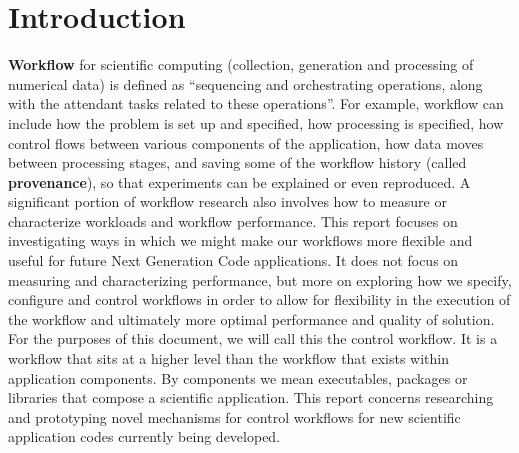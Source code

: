 % 
\section{Introduction}
\label{sec:introduction}

\textbf{Workflow} for scientific computing (collection, generation and processing of numerical data) is 
defined as “sequencing and orchestrating operations, along with the attendant tasks related 
to these operations”\cite{ascr:FutSciWork:2015}.  For example, workflow can include how the problem is
set up and specified, how processing is specified, how control flows between various components
of the application, how data moves between processing stages, and saving some of the workflow
history (called \textbf{provenance}), so that experiments can be explained or even reproduced.  
A significant portion of workflow research also involves how to measure or characterize workloads and
workflow performance.  
This report focuses on investigating ways in which we might make our workflows more flexible
and useful for future Next Generation Code applications.  It does not focus on measuring and 
characterizing performance, but more on exploring how we specify, configure and control workflows
in order to allow for flexibility in the execution of the workflow and ultimately more optimal
performance and quality of solution.  For the purposes of this document, we will call this the 
control workflow.  It is a workflow that sits at a higher level than the workflow that exists 
within application components.  By components we mean executables, packages or libraries that 
compose a scientific application.   This report concerns researching and prototyping 
novel mechanisms for control workflows for new scientific application codes currently being developed.  
